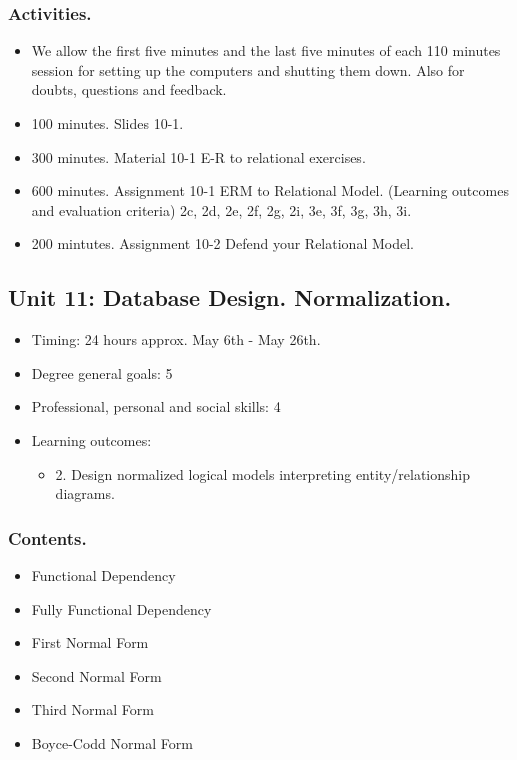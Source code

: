 \documentclass[catalan, a4paper, 12pt, titlepage]{article}
\begin{document}
  \subsubsection{Activities.}
  \begin{itemize}
          \item We allow the first five minutes and the last five minutes of each 110 minutes session for setting up the computers and shutting them down. Also for doubts, questions and feedback.
	  \item 100 minutes. Slides 10-1.
	  \item 300 minutes. Material 10-1 E-R to relational exercises.
	  \item 600 minutes. Assignment 10-1 ERM to Relational Model. (\faGraduationCap Learning outcomes and evaluation criteria) 2c, 2d, 2e, 2f, 2g, 2i, 3e, 3f, 3g, 3h, 3i.
	  \item 200 mintutes. Assignment 10-2 Defend your Relational Model.
  \end{itemize}

  \subsection{Unit 11: Database Design. Normalization.}

  \begin{itemize}
	\item Timing: 24 hours approx. May 6th - May 26th.
	\item Degree general goals: 5
	\item Professional, personal and social skills: 4
	\item Learning outcomes: 
		\begin{itemize}
			\item 2. Design normalized logical models interpreting entity/relationship diagrams.
		\end{itemize}
  \end{itemize}

  \subsubsection{Contents.}
  \begin{itemize}
	\item Functional Dependency
	\item Fully Functional Dependency
	\item First Normal Form
	\item Second Normal Form
	\item Third Normal Form
	\item Boyce-Codd Normal Form
  \end{itemize}
\end{document}
